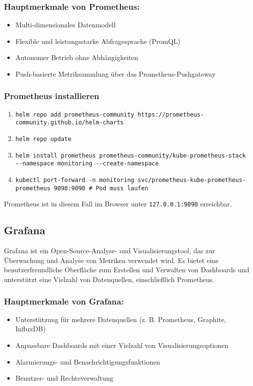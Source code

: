 \subsubsection{Hauptmerkmale von Prometheus:}
\begin{itemize}
  \item Multi-dimensionales Datenmodell
  \item Flexible und leistungsstarke Abfragesprache (PromQL)
  \item Autonomer Betrieb ohne Abhängigkeiten
  \item Push-basierte Metriksammlung über das Prometheus-Pushgateway
\end{itemize}

\subsubsection{Prometheus installieren}
\begin{enumerate}
    \item \texttt{helm repo add prometheus-community https://prometheus-community.github.io/helm-charts}
    \item \texttt{helm repo update}
    \item \texttt{helm install prometheus prometheus-community/kube-prometheus-stack {-}{-}namespace monitoring {-}{-}create-namespace}
    \item \texttt{kubectl port-forward -n monitoring svc/prometheus-kube-prometheus-prometheus 9090:9090 \# Pod muss laufen}
\end{enumerate}

Prometheus ist in diesem Fall im Browser unter \texttt{127.0.0.1:9090} erreichbar.

\subsection{Grafana}
Grafana ist ein Open-Source-Analyse- und Visualisierungstool, das zur Überwachung und Analyse von Metriken verwendet wird. Es bietet eine benutzerfreundliche Oberfläche zum Erstellen und Verwalten von Dashboards und unterstützt eine Vielzahl von Datenquellen, einschließlich Prometheus.

\subsubsection{Hauptmerkmale von Grafana:}
\begin{itemize}
  \item Unterstützung für mehrere Datenquellen (z. B. Prometheus, Graphite, InfluxDB)
  \item Anpassbare Dashboards mit einer Vielzahl von Visualisierungsoptionen
  \item Alarmierungs- und Benachrichtigungsfunktionen
  \item Benutzer- und Rechteverwaltung
\end{itemize}

